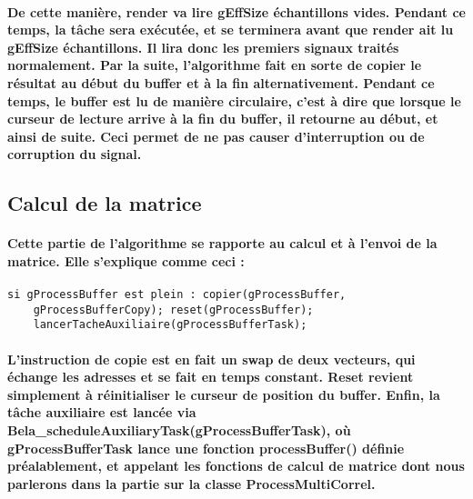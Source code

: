 \documentclass[a4paper]{article}
\begin{document}
\paragraph{De cette manière, render va lire gEffSize échantillons vides. Pendant
ce temps, la tâche sera exécutée, et se terminera avant que render ait lu
gEffSize échantillons. Il lira donc les premiers signaux traités normalement.
Par la suite, l’algorithme fait en sorte de copier le résultat au début du
buffer et à la fin alternativement. Pendant ce temps, le buffer est lu de
manière circulaire, c’est à dire que lorsque le curseur de lecture arrive à la
fin du buffer, il retourne au début, et ainsi de suite. Ceci permet de ne pas
causer d’interruption ou de corruption du signal.}

\subsection{Calcul de la matrice} \paragraph{Cette partie de l’algorithme se
rapporte au calcul et à l’envoi de la matrice. Elle s’explique comme ceci :}

\begin{Verbatim}
si gProcessBuffer est plein : copier(gProcessBuffer,
	gProcessBufferCopy); reset(gProcessBuffer);
	lancerTacheAuxiliaire(gProcessBufferTask);
\end{Verbatim}

\paragraph{L’instruction de copie est en fait un swap de deux vecteurs, qui
échange les adresses et se fait en temps constant. Reset revient simplement à
réinitialiser le curseur de position du buffer. Enfin, la tâche auxiliaire est
lancée via \\ Bela\_scheduleAuxiliaryTask(gProcessBufferTask), où
gProcessBufferTask lance une fonction processBuffer() définie préalablement, et
appelant les fonctions de calcul de matrice dont nous parlerons dans la partie
sur la classe ProcessMultiCorrel.}
\end{document}
